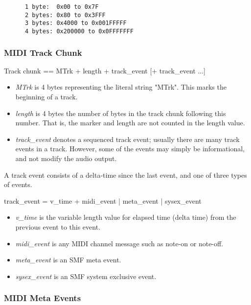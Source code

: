    \begin{verbatim}
      1 byte:  0x00 to 0x7F
      2 bytes: 0x80 to 0x3FFF
      3 bytes: 0x4000 to 0x001FFFFF
      4 bytes: 0x200000 to 0x0FFFFFFF
   \end{verbatim}

\subsubsection{MIDI Track Chunk}
\label{subsec:midi_track_chunk}

   Track chunk == MTrk + length + track\_event [+ track\_event ...]

   \begin{itemize}
      \item \textsl{MTrk} is 4 bytes representing the literal string "MTrk".
         This marks the beginning of a track.
      \item \textsl{length} is 4 bytes the number of bytes in the track
         chunk following this number.  That is, the marker and length are
         not counted in the length value.
      \item \textsl{track\_event} denotes a sequenced track event; usually
         there are many track events in a  track.  However, some of the
         events may simply be informational, and not modify the audio
         output.
   \end{itemize}

   A track event consists of a delta-time since the last event, and one of
   three types of events.
 
   track\_event = v\_time + midi\_event | meta\_event | sysex\_event
 
   \begin{itemize}
      \item \textsl{v\_time} is the variable length value for elapsed time
         (delta time) from the previous event to this event.
      \item \textsl{midi\_event} is any MIDI channel message such as note-on
         or note-off.
      \item \textsl{meta\_event} is an SMF meta event.
      \item \textsl{sysex\_event} is an SMF system exclusive event.
   \end{itemize}

\subsubsection{MIDI Meta Events}
\label{subsec:midi_meta_events}

